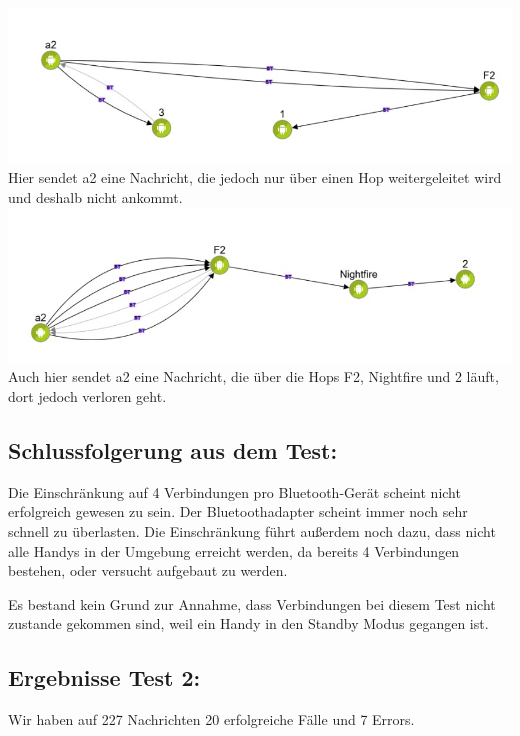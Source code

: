 \includegraphics[width=1.0\textwidth]{belege/grosstests/Bilder/Grosstest2/Test1Misserfolg1.jpg}
Hier sendet a2 eine Nachricht, die jedoch nur über einen Hop
weitergeleitet wird und deshalb nicht ankommt.
\includegraphics[width=1.0\textwidth]{belege/grosstests/Bilder/Grosstest2/Test1Misserfolg3.jpg}
Auch hier sendet a2 eine Nachricht, die über die Hops F2, Nightfire und
2 läuft, dort jedoch verloren geht.

\clearpage\subsection{Schlussfolgerung aus dem
Test:}\label{schlussfolgerung-aus-dem-test-2}

Die Einschränkung auf 4 Verbindungen pro Bluetooth-Gerät scheint nicht
erfolgreich gewesen zu sein. Der Bluetoothadapter scheint immer noch
sehr schnell zu überlasten. Die Einschränkung führt außerdem noch dazu,
dass nicht alle Handys in der Umgebung erreicht werden, da bereits 4
Verbindungen bestehen, oder versucht aufgebaut zu werden.

Es bestand kein Grund zur Annahme, dass Verbindungen bei diesem Test
nicht zustande gekommen sind, weil ein Handy in den Standby Modus
gegangen ist.

\clearpage\subsection{Ergebnisse Test 2:}\label{ergebnisse-test-2-1}

Wir haben auf 227 Nachrichten 20 erfolgreiche Fälle und 7 Errors.

